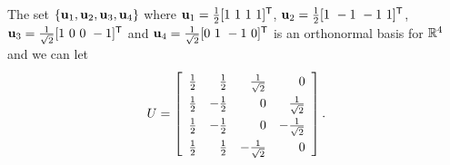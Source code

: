 \begin{example}
The set $\{\mathbf{u}_1, \mathbf{u}_2, \mathbf{u}_3, \mathbf{u}_4\}$ where $\vu_1 = \frac{1}{2}[1 \ 1 \ 1 \ 1]^{\tr}$, $\mathbf{u}_2 = \frac{1}{2}[1 \ -1 \ -1 \ 1]^{\mathsf{T}}$, $\vu_3 = \frac{1}{\sqrt{2}}[1 \ 0 \ 0 \ -1]^{\tr}$ and $\mathbf{u}_4 = \frac{1}{\sqrt{2}}[0 \ 1 \ -1 \ 0]^{\mathsf{T}}$ is an orthonormal basis for $\mathbb{R}^4$ and we can let 
\[U = \left[ \renewcommand{\arraystretch}{1.4} \begin{array}{crrr} \frac{1}{2} & \frac{1}{2} & \frac{1}{\sqrt{2}} & 0 \\ \frac{1}{2} & -\frac{1}{2} & 0 & \frac{1}{\sqrt{2}} \\  \frac{1}{2} & -\frac{1}{2} & 0 & -\frac{1}{\sqrt{2}} \\ \frac{1}{2} & \frac{1}{2} & -\frac{1}{\sqrt{2}} & 0 \\\end{array} \right].\]


\end{example}
